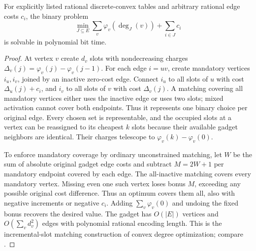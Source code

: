 \begin{proposition}\label{prop:cardinality-matching}
For explicitly listed rational discrete-convex tables and arbitrary
rational edge costs $c_i$, the binary problem
\[
 \min_{J\subseteq E}\sum_v\varphi_v(\deg_J(v))+\sum_{i\in J}c_i
\]
is solvable in polynomial bit time.
\end{proposition}
\begin{proof}
At vertex $v$ create $d_v$ slots with nondecreasing charges
$\Delta_v(j)=\varphi_v(j)-\varphi_v(j-1)$. For each edge $i=uv$, create
mandatory vertices $i_u,i_v$, joined by an inactive zero-cost edge.
Connect $i_u$ to all slots of $u$ with cost $\Delta_u(j)+c_i$, and
$i_v$ to all slots of $v$ with cost $\Delta_v(j)$. A matching covering
all mandatory vertices either uses the inactive edge or uses two slots;
mixed activation cannot cover both endpoints. Thus it represents one
binary choice per original edge. Every chosen set is representable,
and the occupied slots at a vertex can be reassigned to its cheapest
$k$ slots because their available gadget neighbors are identical.
Their charges telescope to $\varphi_v(k)-\varphi_v(0)$.

To enforce mandatory coverage by ordinary unconstrained matching, let
$W$ be the sum of absolute original gadget edge costs and subtract
$M=2W+1$ per mandatory endpoint covered by each edge. The all-inactive
matching covers every mandatory vertex. Missing even one such vertex
loses bonus $M$, exceeding any possible original cost difference.
Thus an optimum covers them all, also with negative increments or
negative $c_i$. Adding $\sum_v\varphi_v(0)$ and undoing the fixed bonus
recovers the desired value. The gadget has $O(|E|)$ vertices and
$O(\sum_vd_v^2)$ edges with polynomial rational encoding length.
This is the incremental-slot matching construction of convex degree
optimization; compare \citet[Theorem 1.2 and Section 3]{DezaOnn2021}.
\end{proof}

